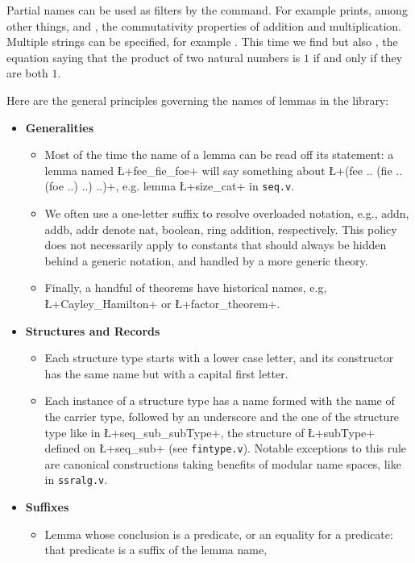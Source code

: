 Partial names can be used as filters by the  command. For example
 prints, among other things,  and ,
the commutativity properties of addition and multiplication.  Multiple
strings can be specified, for example .  This time
we find  but also , the equation saying that
the product of two natural numbers is $1$ if and only if they are both $1$.

Here are the general principles governing the names of lemmas
in the \mcbMC{} library:
\begin{itemize}
\item{\bf Generalities}
  \begin{itemize}
  \item Most of the time the name of a lemma can be read off its
    statement: a lemma named \L+fee_fie_foe+ will say something about
    \L+(fee .. (fie ..(foe ..) ..) ..)+, e.g. lemma \L+size_cat+ in
    {\tt seq.v}.
  \item We often use a one-letter suffix to resolve overloaded
    notation, e.g., addn, addb, addr denote nat, boolean, ring
    addition, respectively. This policy does not necessarily apply to
    constants that should always be hidden behind a generic notation,
    and handled by a more generic theory.
  \item Finally, a handful of theorems have historical names,
    e.g, \L+Cayley_Hamilton+ or \L+factor_theorem+.
  \end{itemize}
\item{\bf Structures and Records}
  \begin{itemize}
  \item Each structure type starts with a
    lower case letter, and its constructor has the same name but with a
    capital first letter.
  \item Each instance of a structure type has a name formed with the
    name of the carrier type, followed by an underscore and the one of
    the structure type like in \L+seq_sub_subType+, the structure of
    \L+subType+ defined on \L+seq_sub+ (see {\tt fintype.v}). Notable
    exceptions to this rule are canonical constructions taking
    benefits of modular name spaces, like in {\tt ssralg.v}.
  \end{itemize}
\item {\bf Suffixes}
  \begin{itemize}
  \item Lemma whose conclusion is a predicate, or an equality
    for a predicate: that predicate is a suffix of the lemma name,

\end{itemize}
\end{itemize}
